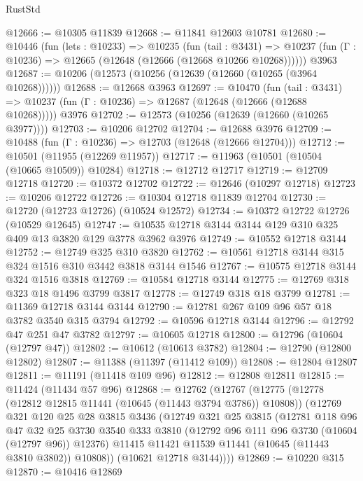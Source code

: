 \begin{lexlean}{RustStd}
\begin{coremodule}
@12666 := @10305 @11839
@12668 := @11841 @12603 @10781
@12680 := @10446
    (fun (lets : @10233) =>
    @10235
      (fun (tail : @3431) =>
      @10237 (fun (Γ : @10236) => @12665 (@12648 (@12666 (@12668 @10266 @10268))))))
    @3963
@12687 := @10206 (@12573 (@10256 (@12639 (@12660 (@10265 (@3964 @10268))))))
@12688 := @12668 @3963
@12697 := @10470
    (fun (tail : @3431) => @10237 (fun (Γ : @10236) => @12687 (@12648 (@12666 (@12688 @10268)))))
    @3976
@12702 := @12573 (@10256 (@12639 (@12660 (@10265 @3977))))
@12703 := @10206 @12702
@12704 := @12688 @3976
@12709 := @10488 (fun (Γ : @10236) => @12703 (@12648 (@12666 @12704)))
@12712 := @10501 (@11955 (@12269 @11957))
@12717 := @11963 (@10501 (@10504 (@10665 @10509)) @10284)
@12718 := @12712 @12717
@12719 := @12709 @12718
@12720 := @10372 @12702
@12722 := @12646 (@10297 @12718)
@12723 := @10206 @12722
@12726 := @10304 @12718 @11839 @12704
@12730 := @12720 (@12723 @12726) (@10524 @12572)
@12734 := @10372 @12722 @12726 (@10529 @12645)
@12747 := @10535 @12718 @3144 @3144 @129 @310 @325 @409 @13 @3820 @129 @3778 @3962 @3976
@12749 := @10552 @12718 @3144
@12752 := @12749 @325 @310 @3820
@12762 := @10561 @12718 @3144 @315 @324 @1516 @310 @3442 @3818 @3144 @1546
@12767 := @10575 @12718 @3144 @324 @1516 @3818
@12769 := @10584 @12718 @3144
@12775 := @12769 @318 @323 @18 @1496 @3799 @3817
@12778 := @12749 @318 @18 @3799
@12781 := @11369 @12718 @3144 @3144
@12790 := @12781 @267 @109 @96 @57 @18 @3782 @3540 @315 @3794
@12792 := @10596 @12718 @3144
@12796 := @12792 @47 @251 @47 @3782
@12797 := @10605 @12718
@12800 := @12796 (@10604 (@12797 @47))
@12802 := @10612 (@10613 @3782)
@12804 := @12790 (@12800 @12802)
@12807 := @11388 (@11397 (@11412 @109))
@12808 := @12804 @12807
@12811 := @11191 (@11418 @109 @96)
@12812 := @12808 @12811
@12815 := @11424 (@11434 @57 @96)
@12868 := @12762
    (@12767
      (@12775
        (@12778 (@12812 @12815 @11441 (@10645 (@11443 @3794 @3786)) @10808))
        (@12769
          @321
          @120
          @25
          @28
          @3815
          @3436
          (@12749
            @321
            @25
            @3815
            (@12781
              @118
              @96
              @47
              @32
              @25
              @3730
              @3540
              @333
              @3810
              (@12792 @96 @111 @96 @3730 (@10604 (@12797 @96)) @12376)
              @11415
              @11421
              @11539
              @11441
              (@10645 (@11443 @3810 @3802))
              @10808))
          (@10621 @12718 @3144))))
@12869 := @10220 @315
@12870 := @10416 @12869

\end{coremodule}
\end{lexlean}
